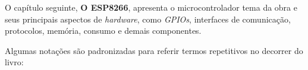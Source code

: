 \documentclass[
	10pt,				%
	openright,			%
	twoside,			%
	a5paper,			%
	english,			%
	french,				%
	spanish,			%
	brazil,				%
	sumario=tradicional
]{abntex2}
\begin{document}
O capítulo seguinte, \textsf{\textbf{O ESP8266}}, apresenta o microcontrolador tema da obra e seus principais aspectos de \textit{hardware}, como \textit{GPIOs}, interfaces de comunicação, protocolos, memória, consumo e demais componentes.



Algumas notações são padronizadas para referir termos repetitivos no decorrer do livro:








\end{document}
